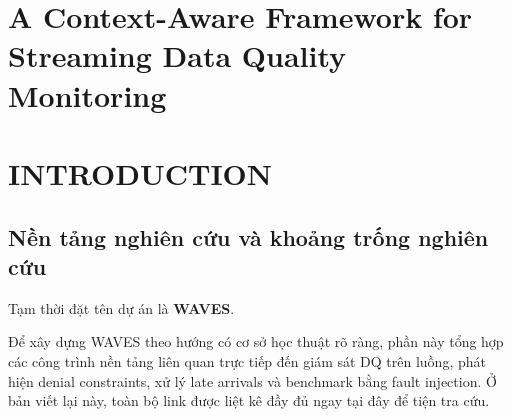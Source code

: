 \chapter*{A Context-Aware Framework for Streaming Data Quality Monitoring}

\chapter{INTRODUCTION}

\section{Nền tảng nghiên cứu và khoảng trống nghiên cứu}

Tạm thời đặt tên dự án là \textbf{WAVES}.

Để xây dựng WAVES theo hướng có cơ sở học thuật rõ ràng, phần này tổng hợp các công trình nền tảng liên quan trực tiếp đến giám sát DQ trên luồng, phát hiện denial constraints, xử lý late arrivals và benchmark bằng fault injection. Ở bản viết lại này, toàn bộ link được liệt kê đầy đủ ngay tại đây để tiện tra cứu.

